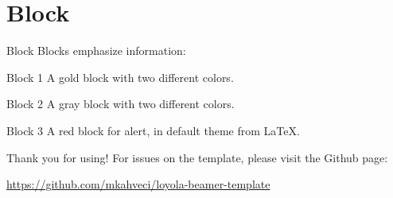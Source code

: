 \documentclass{loyola-beamer}
\begin{document}
\section{Block}

\begin{frame}{Block}
    Blocks emphasize information:
    \begin{block}{Block 1}
    A gold block with two different colors.
    \end{block}
    \begin{exampleblock}{Block 2}
    A gray block with two different colors.
    \end{exampleblock}
    \begin{alertblock}{Block 3}
    A red block for alert, in default theme from \LaTeX.
    \end{alertblock}
\end{frame}

\begin{titleframe}{Thank you for using!}
    For issues on the template, please visit the Github page:
    
    \url{https://github.com/mkahveci/loyola-beamer-template}
\end{titleframe}
\end{document}
